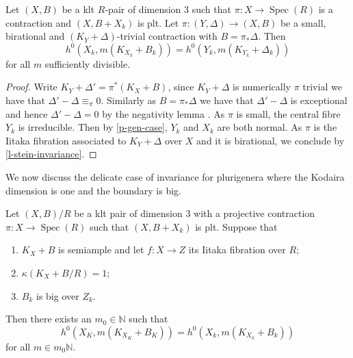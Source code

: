 \documentclass[a4paper,12pt]{book}
\DeclareMathOperator{\Spec}{Spec}
\newcommand{\bN}{\mathbb{N}}
\begin{document}
	\begin{lemma}\label{l-reduce-Q-fac}
		Let $(X,B)$ be a klt $R$-pair of dimension $3$ such that $\pi \colon X \to \Spec(R)$ is a contraction and $(X,B+X_{k})$ is plt.
		Let $\pi\colon (Y,\Delta) \to (X,B)$ be a small, birational and $(K_{Y}+\Delta)$-trivial contraction with $B=\pi_{*}\Delta$. 
		Then
		$$h^{0}(X_{k},m(K_{X_k}+B_{k}))= h^{0}(Y_{k},m(K_{Y_{k}}+\Delta_{k}))$$ 
		for all $m$ sufficiently divisible. 
	\end{lemma}

	\begin{proof}
		Write $K_Y+\Delta'=\pi^* (K_X+B)$, since $K_{Y}+\Delta$ is numerically $\pi$ trivial we have that $\Delta'-\Delta \equiv_{\pi} 0$. Similarly as $B=\pi_{*}\Delta$ we have that $\Delta'-\Delta$ is exceptional and hence $\Delta'-\Delta=0$ by the negativity lemma \cite[Lemma 2.14]{bhatt2020}. As $\pi$ is small, the central fibre $Y_k$ is irreducible. 
		Then by \autoref{p-gen-case}, $Y_k$ and $X_k$ are both normal.
		As $\pi$ is the Iitaka fibration associated to $K_Y+\Delta$ over $X$ and it is birational, we conclude by \autoref{l-stein-invariance}.
	\end{proof}
	
	We now discuss the delicate case of invariance for plurigenera where the Kodaira dimension is one and the boundary is big.
	
	
	\begin{proposition}\label{p-1-case}
		
		Let $(X,B)/R$ be a klt pair of dimension $3$ with a projective contraction $\pi \colon X \to \Spec(R)$ such that $(X,B+X_{k})$ is plt. Suppose that
		\begin{enumerate}
			\item $K_X+B$ is semiample and let $f\colon X \to Z$ its Iitaka fibration over $R$;
			\item $\kappa(K_X+B/R)=1$;
			\item $B_{k}$ is big over $Z_{k}$.
		\end{enumerate}
		Then there exists an $m_{0} \in \mathbb{N}$  such that 
		$$h^0(X_K,m(K_{X_K}+B_K))=h^0(X_k,m(K_{X_k}+B_k))$$
		for all $m\in m_0\bN$.	
	\end{proposition}
	
\end{document}

